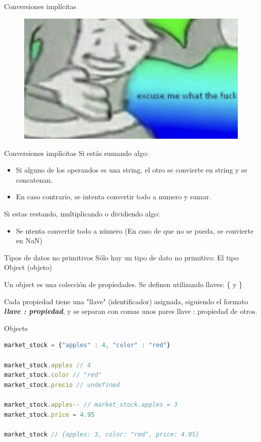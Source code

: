 \documentclass{beamer}
\begin{document}
\begin{frame}{Conversiones implícitas}
    \begin{figure}
        \centering
        \includegraphics[width=\textwidth]{images/excuse_me.jpg}
    \end{figure}
\end{frame}

\begin{frame}{Conversiones implícitas}
Si estás sumando algo:
\begin{itemize}
    \item Si alguno de los operandos es una string, el otro se convierte en string y se concatenan.
    \item En caso contrario, se intenta convertir todo a numero y sumar.
\end{itemize}

Si estas restando, multiplicando o dividiendo algo:
\begin{itemize}
    \item Se ntenta convertir todo a número (En caso de que no se pueda, se convierte en NaN)
\end{itemize}
\end{frame}

\begin{frame}{Tipos de datos no primitivos}
Sólo hay un tipo de dato no primitivo: El tipo Object (objeto)

Un object es una colección de propiedades. Se definen utilizando llaves: \{ y \}\pause

Cada propiedad tiene una "llave" (identificador) asignada, siguiendo el formato \textbf{\textit{llave : propiedad}}, y se separan con comas unos pares llave : propiedad de otros.
\end{frame}

\begin{frame}[fragile]{Objects}
\begin{lstlisting}[language=JavaScript]
market_stock = {"apples" : 4, "color" : "red"}

market_stock.apples // 4
market_stock.color // "red"
market_stock.precio // undefined

market_stock.apples-- // market_stock.apples = 3
market_stock.price = 4.95

market_stock // {apples: 3, color: "red", price: 4.95}
\end{lstlisting}
\end{frame}
\end{document}
